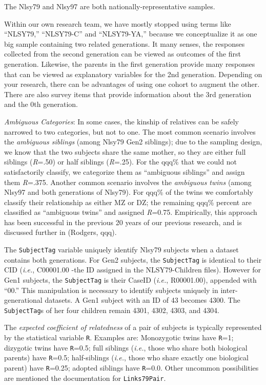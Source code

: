 \documentclass[smallextended]{svjour3}       %
\begin{document}
The Nlsy79 and Nlsy97 are both nationally-representative samples.

Within our own research team, we have mostly stopped using terms like
``NLSY79,'' ``NLSY79-C'' and ``NLSY79-YA,'' because we conceptualize it
as one big sample containing two related generations. It many senses,
the responses collected from the second generation can be viewed as
outcomes of the first generation. Likewise, the parents in the first
generation provide many responses that can be viewed as explanatory
variables for the 2nd generation. Depending on your research, there can
be advantages of using one cohort to augment the other. There are also
survey items that provide information about the 3rd generation and the
0th generation.

\emph{Ambiguous Categories}: In some cases, the kinship of relatives can
be safely narrowed to two categories, but not to one. The most common
scenario involves the \emph{ambiguous siblings} (among Nlsy79 Gen2
siblings); due to the sampling design, we know that the two subjects
share the same mother, so they are either full siblings (\emph{R}=.50)
or half siblings (\emph{R}=.25). For the qqq\% that we could not
satisfactorily classify, we categorize them as ``ambiguous siblings''
and assign them \emph{R}=.375. Another common scenario involves the
\emph{ambiguous twins} (among Nlsy97 and both generations of Nlsy79).
For qqq\% of the twins we comfortably classify their relationship as
either MZ or DZ; the remaining qqq\% percent are classified as
``ambiguous twins'' and assigned \emph{R}=0.75. Empirically, this
approach has been successful in the previous 20 years of our previous
research, and is discussed further in (Rodgers, qqq).

The \texttt{SubjectTag} variable uniquely identify Nlsy79 subjects when
a dataset contains both generations. For Gen2 subjects, the
\texttt{SubjectTag} is identical to their CID (\emph{i.e.}, C00001.00
-the ID assigned in the NLSY79-Children files). However for Gen1
subjects, the \texttt{SubjectTag} is their CaseID (\emph{i.e.},
R00001.00), appended with ``00.'' This manipulation is necessary to
identify subjects uniquely in inter-generational datasets. A Gen1
subject with an ID of 43 becomes 4300. The \texttt{SubjectTag}s of her
four children remain 4301, 4302, 4303, and 4304.

The \emph{expected coefficient of relatedness} of a pair of subjects is
typically represented by the statistical variable \texttt{R}. Examples
are: Monozygotic twins have \texttt{R}=1; dizygotic twins have
\texttt{R}=0.5; full siblings (\emph{i.e.}, those who share both
biological parents) have \texttt{R}=0.5; half-siblings (\emph{i.e.},
those who share exactly one biological parent) have \texttt{R}=0.25;
adopted siblings have \texttt{R}=0.0. Other uncommon possibilities are
mentioned the documentation for \texttt{Links79Pair}.
\end{document}
